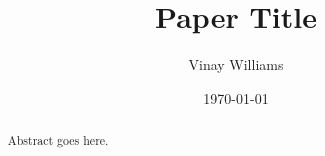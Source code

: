 \title{Paper Title}
\author{Vinay Williams}
\date{\today}
\maketitle

\begin{abstract}
Abstract goes here.
\end{abstract}



% 
% 
% 





